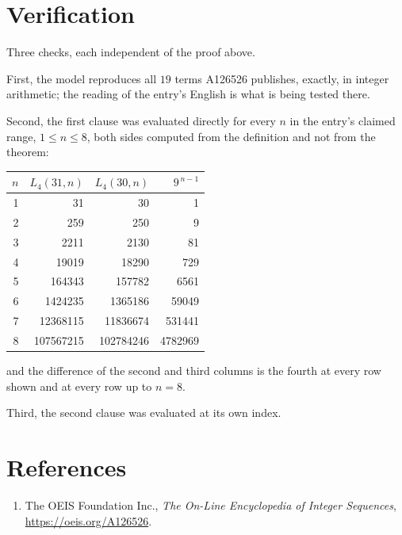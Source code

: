 \documentclass[11pt,a4paper]{article}
\theoremstyle{plain}
\theoremstyle{definition}
\begin{document}
\section{Verification}

Three checks, each independent of the proof above.

First, the model reproduces all $19$ terms A126526 publishes, exactly, in integer
arithmetic; the reading of the entry's English is what is being tested there.

Second, the first clause was evaluated directly for every $n$ in the entry's claimed range,
$1\le n\le8$, both sides computed from the definition and not from the theorem:

\begin{center}
\begin{tabular}{rrrr}
$n$ & $L_{4}(31,n)$ & $L_{4}(30,n)$ & $9^{\,n-1}$ \\ \hline
1 & 31 & 30 & 1 \\
2 & 259 & 250 & 9 \\
3 & 2211 & 2130 & 81 \\
4 & 19019 & 18290 & 729 \\
5 & 164343 & 157782 & 6561 \\
6 & 1424235 & 1365186 & 59049 \\
7 & 12368115 & 11836674 & 531441 \\
8 & 107567215 & 102784246 & 4782969 \\
\end{tabular}
\end{center}

\noindent and the difference of the second and third columns is the fourth at every row shown
and at every row up to $n=8$.

Third, the second clause was evaluated at its own index.

\section*{References}
\begin{enumerate}
\item The OEIS Foundation Inc., \emph{The On-Line Encyclopedia of Integer Sequences},
\url{https://oeis.org/A126526}.
\end{enumerate}
\end{document}

